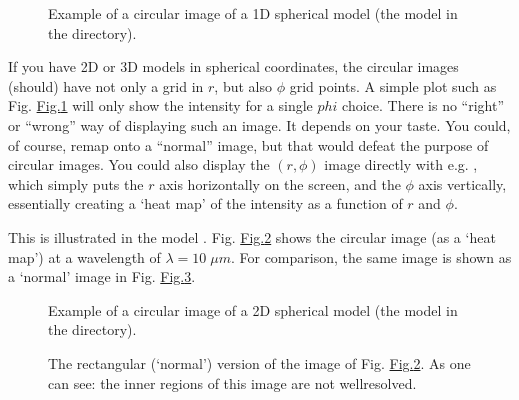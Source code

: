 \documentclass[letterpaper,10pt,english]{sphinxmanual}
\begin{document}
\begin{figure}[htbp]
\centering
\capstart

\noindent{}
\caption{Example of a circular image of a 1\sphinxhyphen{}D spherical model (the model in the
 directory).}\label{\detokenize{imagesspectra:id11}}\label{\detokenize{imagesspectra:fig-circ-image}}\end{figure}

If you have 2\sphinxhyphen{}D or 3\sphinxhyphen{}D models in spherical coordinates, the circular images
(should) have not only a grid in \(r\), but also \(\phi\) grid points.
A simple plot such as Fig. \hyperref[\detokenize{imagesspectra:fig-circ-image}]{Fig.\@ \ref{\detokenize{imagesspectra:fig-circ-image}}} will only show the intensity
for a single \(phi\) choice. There is no “right” or “wrong” way of displaying
such an image. It depends on your taste. You could, of course, remap onto a
“normal” image, but that would defeat the purpose of circular images. You could
also display the \((r,\phi)\) image directly with e.g. ,
which simply puts the \(r\) axis horizontally on the screen, and the
\(\phi\) axis vertically, essentially creating a ‘heat map’ of the
intensity as a function of \(r\) and \(\phi\).

This is illustrated in the model .
Fig. \hyperref[\detokenize{imagesspectra:fig-circ-image-2d}]{Fig.\@ \ref{\detokenize{imagesspectra:fig-circ-image-2d}}} shows the circular image (as a ‘heat map’)
at a wavelength of \(\lambda=10\;\mu m\). For comparison, the same image
is shown as a ‘normal’ image in Fig. \hyperref[\detokenize{imagesspectra:fig-rect-circ-image-2d}]{Fig.\@ \ref{\detokenize{imagesspectra:fig-rect-circ-image-2d}}}.

\begin{figure}[htbp]
\centering
\capstart

\noindent{}
\caption{Example of a circular image of a 2\sphinxhyphen{}D spherical model (the model in the
 directory).}\label{\detokenize{imagesspectra:id12}}\label{\detokenize{imagesspectra:fig-circ-image-2d}}\end{figure}

\begin{figure}[htbp]
\centering
\capstart

\noindent{}
\caption{The rectangular (‘normal’) version of the image of Fig. \hyperref[\detokenize{imagesspectra:fig-circ-image-2d}]{Fig.\@ \ref{\detokenize{imagesspectra:fig-circ-image-2d}}}.
As one can see: the inner regions of this image are not well\sphinxhyphen{}resolved.}\label{\detokenize{imagesspectra:id13}}\label{\detokenize{imagesspectra:fig-rect-circ-image-2d}}\end{figure}
\end{document}
